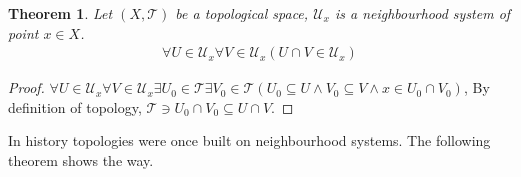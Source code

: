 \documentclass{article}%
\theoremstyle{plain}
\newtheorem{theorem}{Theorem}[section] %
\theoremstyle{definition}
\begin{document}
\begin{theorem}
Let $(X,\mathscr T)$ be a topological space, $\mathscr U_x$ is a neighbourhood system of point $x\in X$.
\begin{align*}
	\forall U\in \mathscr U_x\forall V\in \mathscr U_x( U\cap V\in \mathscr U_x)
\end{align*}
\end{theorem}
\begin{proof}
$\forall U\in \mathscr U_x\forall V\in \mathscr U_x\exists U_0\in \mathscr T\exists V_0\in \mathscr T(U_0\subseteq U\wedge V_0\subseteq V\wedge x\in U_0\cap V_0 )$, By definition of topology, $\mathscr T\ni U_0\cap V_0\subseteq U\cap V$. 
\end{proof}

In history topologies were once built on neighbourhood systems. The following theorem shows the way.
 
\end{document}
